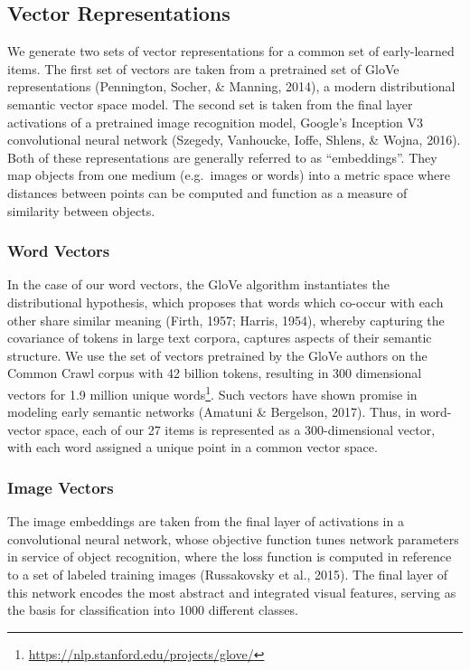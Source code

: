 \documentclass[10pt, letterpaper]{article}
\begin{document}
\subsection{Vector Representations}\label{vector-representations}

We generate two sets of vector representations for a common set of
early-learned items. The first set of vectors are taken from a
pretrained set of GloVe representations (Pennington, Socher, \& Manning,
2014), a modern distributional semantic vector space model. The second
set is taken from the final layer activations of a pretrained image
recognition model, Google's Inception V3 convolutional neural network
(Szegedy, Vanhoucke, Ioffe, Shlens, \& Wojna, 2016). Both of these
representations are generally referred to as ``embeddings''. They map
objects from one medium (e.g.~images or words) into a metric space where
distances between points can be computed and function as a measure of
similarity between objects.

\subsubsection{Word Vectors}\label{word-vectors}

In the case of our word vectors, the GloVe algorithm instantiates the
distributional hypothesis, which proposes that words which co-occur with
each other share similar meaning (Firth, 1957; Harris, 1954), whereby
capturing the covariance of tokens in large text corpora, captures
aspects of their semantic structure. We use the set of vectors
pretrained by the GloVe authors on the Common Crawl corpus with 42
billion tokens, resulting in 300 dimensional vectors for 1.9 million
unique words\footnote{\url{https://nlp.stanford.edu/projects/glove/}}.
Such vectors have shown promise in modeling early semantic networks
(Amatuni \& Bergelson, 2017). Thus, in word-vector space, each of our 27
items is represented as a 300-dimensional vector, with each word
assigned a unique point in a common vector space.

\subsubsection{Image Vectors}\label{image-vectors}

The image embeddings are taken from the final layer of activations in a
convolutional neural network, whose objective function tunes network
parameters in service of object recognition, where the loss function is
computed in reference to a set of labeled training images (Russakovsky
et al., 2015). The final layer of this network encodes the most abstract
and integrated visual features, serving as the basis for classification
into 1000 different classes.
\end{document}
